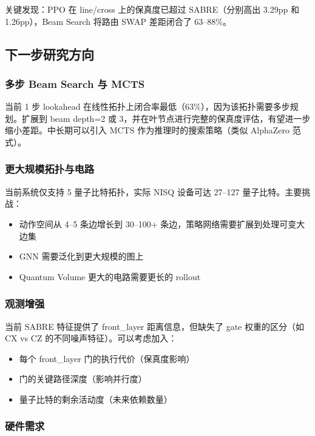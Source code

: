 关键发现：PPO 在 line/cross 上的保真度已超过 SABRE（分别高出 3.29pp 和 1.26pp），Beam Search 将路由 SWAP 差距闭合了 63--88\%。

\subsection{下一步研究方向}

\subsubsection{多步 Beam Search 与 MCTS}

当前 1 步 lookahead 在线性拓扑上闭合率最低（63\%），因为该拓扑需要多步规划。扩展到 beam depth=2 或 3，并在叶节点进行完整的保真度评估，有望进一步缩小差距。中长期可以引入 MCTS 作为推理时的搜索策略（类似 AlphaZero 范式）。

\subsubsection{更大规模拓扑与电路}

当前系统仅支持 5 量子比特拓扑，实际 NISQ 设备可达 27--127 量子比特。主要挑战：
\begin{itemize}
  \item 动作空间从 4--5 条边增长到 30--100+ 条边，策略网络需要扩展到处理可变大边集
  \item GNN 需要泛化到更大规模的图上
  \item Quantum Volume 更大的电路需要更长的 rollout
\end{itemize}

\subsubsection{观测增强}

当前 SABRE 特征提供了 front\_layer 距离信息，但缺失了 gate 权重的区分（如 CX vs CZ 的不同噪声特征）。可以考虑加入：
\begin{itemize}
  \item 每个 front\_layer 门的执行代价（保真度影响）
  \item 门的关键路径深度（影响并行度）
  \item 量子比特的剩余活动度（未来依赖数量）
\end{itemize}

\subsubsection{硬件需求}

